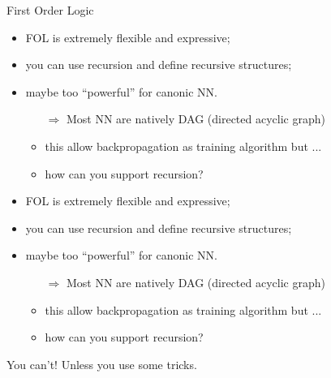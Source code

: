 \documentclass[presentation]{beamer}\mode<presentation>{\usetheme{AMSBolognaFC}}
\begin{document}
\begin{frame}[allowframebreaks]{First Order Logic}
    \begin{itemize}
        \item FOL is extremely flexible and expressive;
        \item you can use recursion and define recursive structures;
        \item maybe too ``powerful'' for canonic NN.
        \begin{itemize}
            \item[$\Rightarrow$] Most NN are natively DAG (directed acyclic graph)
            \item this allow backpropagation as training algorithm but ...
            \item how can you support recursion?  
        \end{itemize}
    \end{itemize}
    \centering
    \phantom{You can't!}
    \phantom{Unless you use some tricks.}
    
    \framebreak
    
    \begin{itemize}
        \item FOL is extremely flexible and expressive;
        \item you can use recursion and define recursive structures;
        \item maybe too ``powerful'' for canonic NN.
        \begin{itemize}
            \item[$\Rightarrow$] Most NN are natively DAG (directed acyclic graph)
            \item this allow backpropagation as training algorithm but ...
            \item how can you support recursion?  
        \end{itemize}
    \end{itemize}
    \centering
    You can't!
    Unless you use some tricks.
    
    \framebreak
    

\end{frame}
\end{document}
